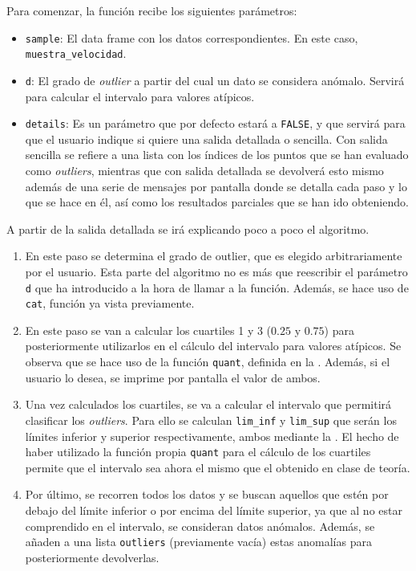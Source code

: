 \documentclass[12pt]{report}\usepackage[]{graphicx}\usepackage[dvipsnames]{xcolor}
\begin{document}
					Para comenzar, la función recibe los siguientes parámetros:
					\begin{itemize}
						\item \texttt{sample}: El data frame con los datos correspondientes. En este caso, \texttt{muestra\_velocidad}. 
						\item \texttt{d}: El grado de \textit{outlier} a partir del cual un dato se considera anómalo. Servirá para calcular el intervalo para valores atípicos.
						\item \texttt{details}: Es un parámetro que por defecto estará a \texttt{FALSE}, y que servirá para que el usuario indique si quiere una salida detallada o sencilla. Con salida sencilla se refiere a una lista con los índices de los puntos que se han evaluado como \textit{outliers}, mientras que con salida detallada se devolverá esto mismo además de una serie de mensajes por pantalla donde se detalla cada paso y lo que se hace en él, así como los resultados parciales que se han ido obteniendo.
					\end{itemize}
					
					A partir de la salida detallada se irá explicando poco a poco el algoritmo.
					
					\begin{enumerate}[label = \textbf{\arabic*. }]
						\item En este paso se determina el grado de outlier, que es elegido arbitrariamente por el usuario. Esta parte del algoritmo no es más que reescribir el parámetro \texttt{d} que ha introducido a la hora de llamar a la función. Además, se hace uso de \texttt{cat}, función ya vista previamente.
						
						\item En este paso se van a calcular los cuartiles 1 y 3 ($0.25$ y $0.75$) para posteriormente utilizarlos en el cálculo del intervalo para valores atípicos. Se observa que se hace uso de la función \texttt{quant}, definida en la . Además, si el usuario lo desea, se imprime por pantalla el valor de ambos.
						
						\item Una vez calculados los cuartiles, se va a calcular el intervalo que permitirá clasificar los \textit{outliers}. Para ello se calculan \texttt{lim\_inf} y \texttt{lim\_sup} que serán los límites inferior y superior respectivamente, ambos mediante la . El hecho de haber utilizado la función propia \texttt{quant} para el cálculo de los cuartiles permite que el intervalo sea ahora el mismo que el obtenido en clase de teoría.
						
						\item Por último, se recorren todos los datos y se buscan aquellos que estén por debajo del límite inferior o por encima del límite superior, ya que al no estar comprendido en el intervalo, se consideran datos anómalos. Además, se añaden a una lista \texttt{outliers} (previamente vacía) estas anomalías para posteriormente devolverlas.
					\end{enumerate}
					
\end{document}
